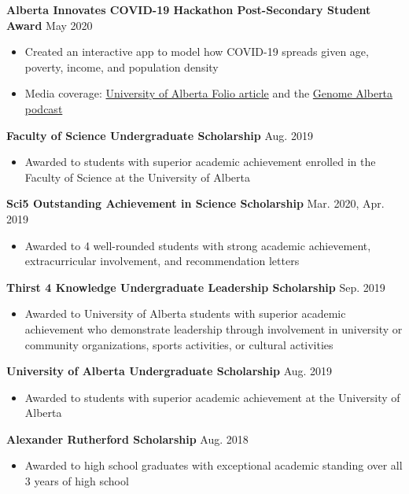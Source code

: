 \documentclass{article}
\begin{document}
\textbf{Alberta Innovates COVID-19 Hackathon Post-Secondary Student Award} \hfill May 2020
\begin{itemize}
    \item Created an interactive app to model how COVID-19 spreads given age, poverty, income, and population density
    \item Media coverage: \href{https://www.folio.ca/students-develop-online-tool-to-predict-covid-19-spread-based-on-demographics/}{University of Alberta Folio article} and the \href{https://genomealberta.ca/genomics/genomics_blog_08182001.aspx}{Genome Alberta podcast}
\end{itemize} \vspace{1em}

\textbf{Faculty of Science Undergraduate Scholarship} \hfill Aug. 2019
\begin{itemize}
    \item Awarded to students with superior academic achievement enrolled in the Faculty of Science at the University of Alberta
\end{itemize} \vspace{1em}

\textbf{Sci5 Outstanding Achievement in Science Scholarship} \hfill Mar. 2020, Apr. 2019
\begin{itemize}
    \item Awarded to 4 well-rounded students with strong academic achievement, extracurricular involvement, and recommendation letters
\end{itemize} \vspace{1em}

\textbf{Thirst 4 Knowledge Undergraduate Leadership Scholarship} \hfill Sep. 2019
\begin{itemize}
    \item Awarded to University of Alberta students with superior academic achievement who demonstrate leadership through involvement in university or community organizations, sports activities, or cultural activities
\end{itemize} \vspace{1em}

\textbf{University of Alberta Undergraduate Scholarship} \hfill Aug. 2019
\begin{itemize}
    \item Awarded to students with superior academic achievement at the University of Alberta
\end{itemize} \vspace{1em}

\textbf{Alexander Rutherford Scholarship} \hfill Aug. 2018
\begin{itemize}
    \item Awarded to high school graduates with exceptional academic standing over all 3 years of high school
\end{itemize} \vspace{1em}
\end{document}
